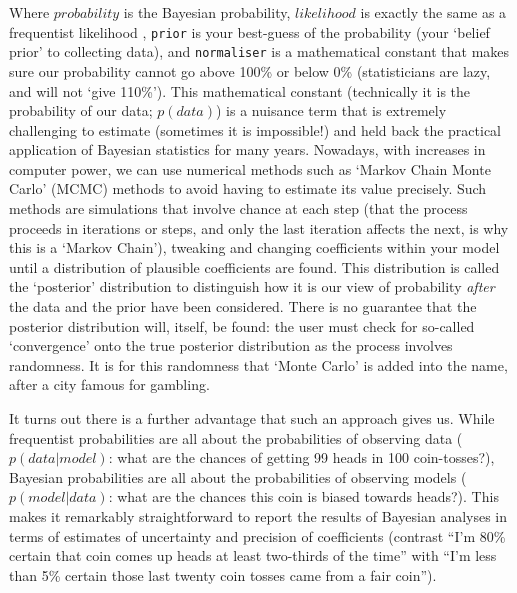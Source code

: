\documentclass[11pt]{article}
\begin{document}
{Where $probability$ is the Bayesian probability, $likelihood$ is exactly the same as a frequentist likelihood
, \texttt{prior} is your best-guess of the probability (your `belief prior' to collecting data), and \texttt{normaliser} is a mathematical constant that makes sure our probability cannot go above 100\% or below 0\% (statisticians are lazy, and will not `give 110\%'). This mathematical constant (technically it is the probability of our data; $p(data)$) is a nuisance term that is extremely challenging to estimate (sometimes it is impossible!) and held back the practical application of Bayesian statistics for many years. Nowadays, with increases in computer power, we can use numerical methods such as `Markov Chain Monte Carlo' (MCMC) methods to avoid having to estimate its value precisely. Such methods are simulations  that involve chance at each step (that the process proceeds in iterations or steps, and only the last iteration affects the next, is why this is a `Markov Chain'), tweaking and changing coefficients within your model until a distribution of plausible coefficients are found. This distribution is called the `posterior' distribution to distinguish how it is our view of probability \emph{after} the data and the prior have been considered. There is no guarantee that the posterior distribution will, itself, be found: the user must check for so-called `convergence' onto the true posterior distribution as the process involves randomness. It is for this randomness that `Monte Carlo' is added into the name, after a city famous for gambling.

It turns out there is a further advantage that such an approach gives us. While frequentist probabilities are all about the probabilities of observing data ($p(data|model)$: what are the chances of getting 99 heads in 100 coin-tosses?), Bayesian probabilities are all about the probabilities of observing models ($p(model|data)$: what are the chances this coin is biased towards heads?). This makes it remarkably straightforward to report the results of Bayesian analyses in terms of estimates of uncertainty and precision of coefficients (contrast ``I'm 80\% certain that coin comes up heads at least two-thirds of the time'' with ``I'm less than 5\% certain those last twenty coin tosses came from a fair coin'').


}
\end{document}
